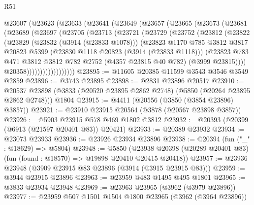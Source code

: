 \begin{lexlean}{R51}
\begin{coremodule}
    @23607
      (@23623
        (@23633
          (@23641
            (@23649
              (@23657
                (@23665
                  (@23673
                    (@23681
                      (@23689
                        (@23697
                          (@23705
                            (@23713
                              (@23721
                                (@23729
                                  (@23752
                                    (@23812
                                      (@23822
                                        (@23829
                                          (@23832 (@3914 (@23833 @1078)))
                                          (@23823
                                            @1170
                                            @785
                                            @3812
                                            @3817
                                            @20823
                                            @5399
                                            (@23830 @1118 @20823 (@3914 (@23833 @1118)))
                                            (@23823
                                              @783
                                              @471
                                              @3812
                                              @3812
                                              @782
                                              @2752
                                              (@4357 @23815 @40 @782)
                                              (@3999 @23815))))
                                        @20358))))))))))))))))))
@23895 := @11605 @20385 @11599 @3543 @3546 @3549 @2859
@23896 := @3743 @23895
@23898 := @2831 @23896 @20517
@23910 := @20537
    @23898
    (@3833 (@20520 @23895 @2862 @2748) (@5850 (@20264 @23895 @2862 @2748)))
    @1804
@23915 := @4411 (@20556 (@3850 (@3854 @23896) @3857))
@23921 := @23910 @23915 @20564 (@3878 (@20567 @23898 @3857))
@23926 := @5903 @23915 @578 @469 @1802 @3812
@23932 := @20393 (@20399 (@6913 (@21597 @20401 @83)) @20421)
@23933 := @20389 @23932
@23934 := @23073 @23933
@23936 := @23926 @23934 @23896
@23938 := @20394 (fun ("_" : @18629) => @5804)
@23948 := @5850
    (@23938 @20398 (@20289 @20401 @83) (fun (found : @18570) => @19898 @20410 @20415 @20418))
@23957 := @23936 @23948 (@3909 @23915 @83 @23896 (@3914 (@3915 @23915 @83)))
@23959 := @3944 @23915 @23896
@23963 := @23959 @483 @1495 @495 @1801
@23965 := @3833 @23934 @23948
@23969 := @23963 @23965 (@3962 (@3979 @23896))
@23977 := @23959 @507 @1501 @1504 @1800 @23965 (@3962 (@3964 @23896))

\end{coremodule}
\end{lexlean}
